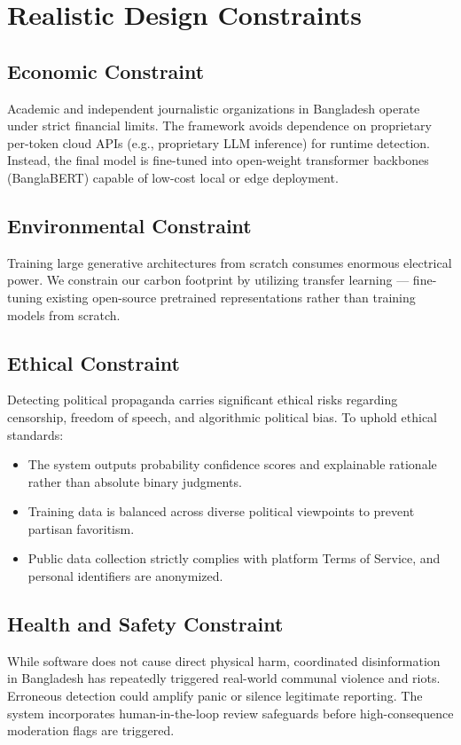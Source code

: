 \section{Realistic Design Constraints}

\subsection{Economic Constraint}
Academic and independent journalistic organizations in Bangladesh operate under
strict financial limits. The framework avoids dependence on proprietary per-token
cloud APIs (e.g., proprietary LLM inference) for runtime detection. Instead, the
final model is fine-tuned into open-weight transformer backbones (BanglaBERT)
capable of low-cost local or edge deployment.

\subsection{Environmental Constraint}
Training large generative architectures from scratch consumes enormous electrical
power. We constrain our carbon footprint by utilizing transfer learning ---
fine-tuning existing open-source pretrained representations rather than training
models from scratch.

\subsection{Ethical Constraint}
Detecting political propaganda carries significant ethical risks regarding
censorship, freedom of speech, and algorithmic political bias. To uphold ethical
standards:
\begin{itemize}
  \item The system outputs probability confidence scores and explainable rationale
        rather than absolute binary judgments.
  \item Training data is balanced across diverse political viewpoints to prevent
        partisan favoritism.
  \item Public data collection strictly complies with platform Terms of Service,
        and personal identifiers are anonymized.
\end{itemize}

\subsection{Health and Safety Constraint}
While software does not cause direct physical harm, coordinated disinformation in
Bangladesh has repeatedly triggered real-world communal violence and riots.
Erroneous detection could amplify panic or silence legitimate reporting. The system
incorporates human-in-the-loop review safeguards before high-consequence moderation
flags are triggered.


